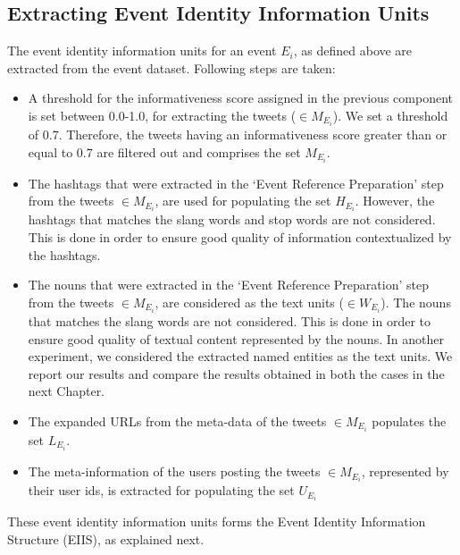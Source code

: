 \subsection{Extracting Event Identity Information Units}
The event identity information units for an event $E_{i}$, as defined above are extracted from the event dataset. Following steps are taken:
\begin{itemize}
\item A threshold for the informativeness score assigned in the previous component is set between 0.0-1.0, for extracting the tweets ($\in M_{E_{i}}$). We set a threshold of 0.7. Therefore, the tweets having an informativeness score greater than or equal to 0.7 are filtered out and comprises the set $M_{E_{i}}$.
\item The hashtags that were extracted in the `Event Reference Preparation' step from the tweets $\in M_{E_{i}}$, are used for populating the set $H_{E_{i}}$. However, the hashtags that matches the slang words and stop words are not considered. This is done in order to ensure good quality of information contextualized by the hashtags.
\item The nouns that were extracted in the `Event Reference Preparation' step from the tweets $\in M_{E_{i}}$, are considered as the text units ($\in W_{E_{i}}$). The nouns that matches the slang words are not considered. This is done in order to ensure good quality of textual content represented by the nouns. In another experiment, we considered the extracted named entities as the text units. We report our results and compare the results obtained in both the cases in the next Chapter.
\item The expanded URLs from the meta-data of the tweets $\in M_{E_{i}}$ populates the set $L_{E_{i}}$.
\item The meta-information of the users posting the tweets $\in M_{E_{i}}$, represented by their user ids, is extracted for populating the set $U_{E_{i}}$ 
\end{itemize}  

These event identity information units forms the Event Identity Information Structure (EIIS), as explained next.

